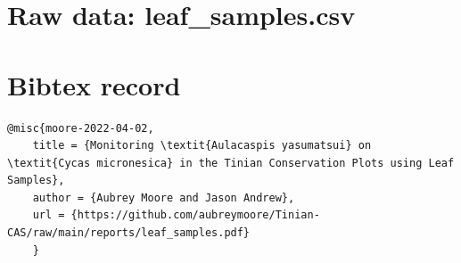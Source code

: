 \documentclass[12pt,letterpaper,english,bibliography=totocnumbered, abstract=on]{scrartcl}
\begin{document}
\clearpage
\begin{appendices}
	
	\section{Raw data: leaf\_samples.csv}
	\label{leaf_samples.csv}
	
		

	\section{Bibtex record}
	\begin{lstlisting}[basicstyle=\small\ttfamily, breaklines=true, columns=flexible]
	@misc{moore-2022-04-02,
	title = {Monitoring \textit{Aulacaspis yasumatsui} on \textit{Cycas micronesica} in the Tinian Conservation Plots using Leaf Samples},
	author = {Aubrey Moore and Jason Andrew},
	url = {https://github.com/aubreymoore/Tinian-CAS/raw/main/reports/leaf_samples.pdf} 	
	}
	\end{lstlisting}
		
\end{appendices}
\end{document}
